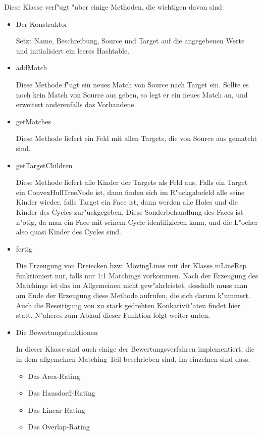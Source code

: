 Diese Klasse verf"ugt "uber einige Methoden, die wichtigen davon  sind:

\begin{itemize}

\item Der Konstruktor

Setzt Name, Beschreibung, Source und Target auf die angegebenen Werte und initialisiert ein leeres Hashtable.

\item addMatch

Diese Methode f"ugt ein neues Match von Source nach Target ein. Sollte es noch kein Match von Source aus geben, so legt er ein neues Match an, und erweitert anderenfalls das Vorhandene.

\item getMatches

Diese Methode liefert ein Feld mit allen Targets, die von Source aus gematcht sind.

\item getTargetChildren

Diese Methode liefert alle Kinder der Targets als Feld aus. Falls ein Target ein ConvexHullTreeNode ist, dann finden sich im R"uckgabefeld alle seine Kinder  wieder, falls Target ein Face ist, dann werden alle Holes und die Kinder des Cycles zur"uckgegeben. Diese Sonderbehandlung des Faces ist n"otig, da man ein Face mit seinem Cycle identifizieren kann, und die L"ocher also quasi Kinder des Cycles sind.

\item fertig

Die Erzeugung von Dreiecken bzw. MovingLines mit der Klasse mLineRep funktioniert nur, falls nur 1:1 Matchings vorkommen. Nach der Erzeugung des Matchings ist das im Allgemeinen nicht gew"ahrleistet, desshalb muss man am Ende der Erzeugung diese Methode aufrufen, die sich darum k"ummert. Auch die Beseitigung von zu stark gedrehten Konkativit"aten findet hier statt. N"aheres zum Ablauf dieser Funktion folgt weiter unten.

\item Die Bewertungsfunktionen

In dieser Klasse sind auch einige der Bewertungsverfahren implementiert, die in dem allgemeinen Matching-Teil beschrieben sind. Im einzelnen sind dass:
\begin{itemize}
\item Das Area-Rating
\item Das Hausdorff-Rating
\item Das Linear-Rating
\item Das Overlap-Rating
\end{itemize}

\end{itemize}

